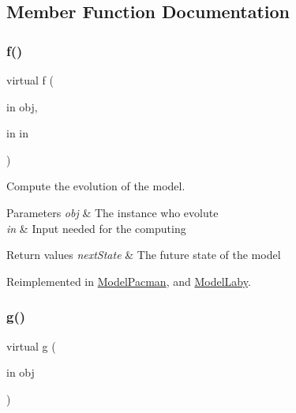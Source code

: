 \subsection{Member Function Documentation}
\mbox{\label{class_model_s_e_d_ac36f9451c43b120828af4380858f2024}} 
\subsubsection{\texorpdfstring{f()}{f()}}
{\footnotesize\ttfamily virtual f (\begin{DoxyParamCaption}\item[{in}]{obj,  }\item[{in}]{in }\end{DoxyParamCaption})\hspace{0.3cm}{\ttfamily [virtual]}}



Compute the evolution of the model. 


\begin{DoxyParams}{Parameters}
{\em obj} & The instance who evolute \\
\hline
{\em in} & Input needed for the computing \\
\hline
\end{DoxyParams}

\begin{DoxyRetVals}{Return values}
{\em next\+State} & The future state of the model \\
\hline
\end{DoxyRetVals}


Reimplemented in \hyperlink{class_model_pacman_a6f3b146c92a207e95690d08975e1e072}{Model\+Pacman}, and \hyperlink{class_model_laby_a6f3b146c92a207e95690d08975e1e072}{Model\+Laby}.

\mbox{\label{class_model_s_e_d_ac6bf71081e35755d5ed9992d165afcb8}} 
\subsubsection{\texorpdfstring{g()}{g()}}
{\footnotesize\ttfamily virtual g (\begin{DoxyParamCaption}\item[{in}]{obj }\end{DoxyParamCaption})\hspace{0.3cm}{\ttfamily [virtual]}}



